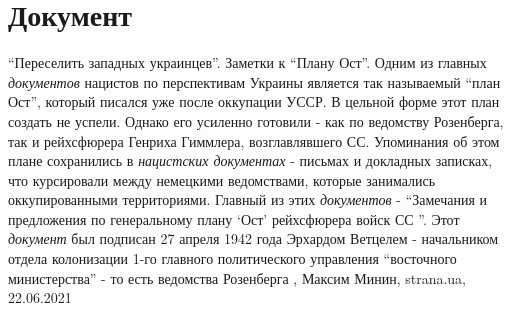  
 
 
 
 
\chapter{Документ}

\enquote{Переселить западных украинцев}. Заметки к \enquote{Плану Ост}.  Одним
из главных \emph{документов} нацистов по перспективам Украины является так
называемый \enquote{план Ост}, который писался уже после оккупации УССР.  В
цельной форме этот план создать не успели. Однако его усиленно готовили - как
по ведомству Розенберга, так и рейхсфюрера Генриха Гиммлера, возглавлявшего СС.
Упоминания об этом плане сохранились в \emph{нацистских документах} - письмах и
докладных записках, что курсировали между немецкими ведомствами, которые
занимались оккупированными территориями.  Главный из этих \emph{документов} -
\enquote{Замечания и предложения по генеральному плану \enquote{Ост}
рейхсфюрера войск СС }. Этот \emph{документ} был подписан 27 апреля 1942 года
Эрхардом Ветцелем - начальником отдела колонизации 1-го главного политического
управления \enquote{восточного министерства} - то есть ведомства Розенберга
  , Максим Минин, strana.ua, 22.06.2021
